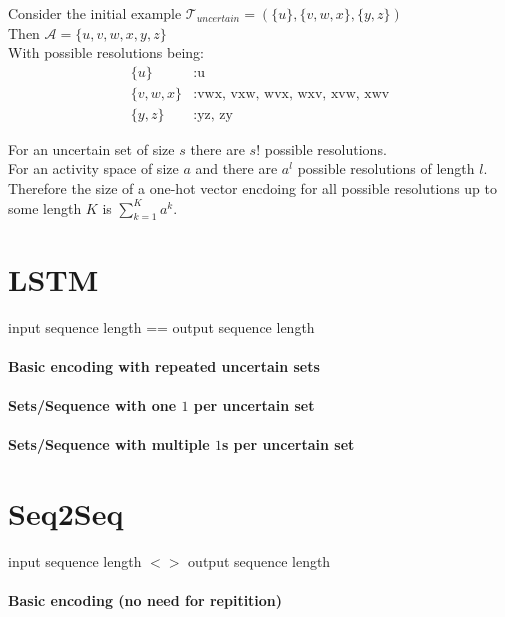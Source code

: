 \documentclass[a4paper,12pt]{scrartcl}
\begin{document}
\maketitle

\noindent Consider the initial example $\mathcal{T}_{uncertain} = (\{u\}, \{v,w,x\}, \{y,z\})$ \\
Then $\mathcal{A} = \{u, v, w, x, y, z\}$\\
With possible resolutions being: 
\begin{align*}
	\{u\}     &: \text{u} \\
	\{v,w,x\} &: \text{vwx, vxw, wvx, wxv, xvw, xwv} \\
	\{y,z\}   &: \text{yz, zy}
\end{align*}

\noindent For an uncertain set of size $s$ there are $s!$ possible resolutions. \\
For an activity space of size $a$ and there are $a^l$ possible resolutions of length $l$. Therefore the size of a one-hot vector encdoing for all possible resolutions up to some length $K$ is $\sum_{k=1}^K a^k$.


\section*{LSTM}
input sequence length == output sequence length

	\paragraph*{Basic encoding with repeated uncertain sets}
		
	
	\paragraph*{Sets/Sequence with one $1$ per uncertain set}
	
		
	\paragraph*{Sets/Sequence with multiple $1$s per uncertain set}

	
\section*{Seq2Seq}
input sequence length $<>$ output sequence length

	\paragraph*{Basic encoding (no need for repitition)}
	
\end{document}
